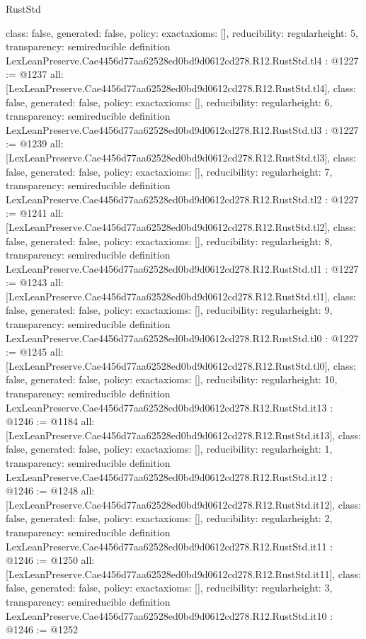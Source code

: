 \begin{lexlean}{RustStd}
\begin{coremodule}
{  class: false,
  generated: false,
  policy: exact{axioms: []},
  reducibility: regular{height: 5},
  transparency: semireducible
}
definition LexLeanPreserve.Cae4456d77aa62528ed0bd9d0612cd278.R12.RustStd.tl4 : @1227 := @1237 {
  all: [LexLeanPreserve.Cae4456d77aa62528ed0bd9d0612cd278.R12.RustStd.tl4],
  class: false,
  generated: false,
  policy: exact{axioms: []},
  reducibility: regular{height: 6},
  transparency: semireducible
}
definition LexLeanPreserve.Cae4456d77aa62528ed0bd9d0612cd278.R12.RustStd.tl3 : @1227 := @1239 {
  all: [LexLeanPreserve.Cae4456d77aa62528ed0bd9d0612cd278.R12.RustStd.tl3],
  class: false,
  generated: false,
  policy: exact{axioms: []},
  reducibility: regular{height: 7},
  transparency: semireducible
}
definition LexLeanPreserve.Cae4456d77aa62528ed0bd9d0612cd278.R12.RustStd.tl2 : @1227 := @1241 {
  all: [LexLeanPreserve.Cae4456d77aa62528ed0bd9d0612cd278.R12.RustStd.tl2],
  class: false,
  generated: false,
  policy: exact{axioms: []},
  reducibility: regular{height: 8},
  transparency: semireducible
}
definition LexLeanPreserve.Cae4456d77aa62528ed0bd9d0612cd278.R12.RustStd.tl1 : @1227 := @1243 {
  all: [LexLeanPreserve.Cae4456d77aa62528ed0bd9d0612cd278.R12.RustStd.tl1],
  class: false,
  generated: false,
  policy: exact{axioms: []},
  reducibility: regular{height: 9},
  transparency: semireducible
}
definition LexLeanPreserve.Cae4456d77aa62528ed0bd9d0612cd278.R12.RustStd.tl0 : @1227 := @1245 {
  all: [LexLeanPreserve.Cae4456d77aa62528ed0bd9d0612cd278.R12.RustStd.tl0],
  class: false,
  generated: false,
  policy: exact{axioms: []},
  reducibility: regular{height: 10},
  transparency: semireducible
}
definition LexLeanPreserve.Cae4456d77aa62528ed0bd9d0612cd278.R12.RustStd.it13 : @1246 := @1184 {
  all: [LexLeanPreserve.Cae4456d77aa62528ed0bd9d0612cd278.R12.RustStd.it13],
  class: false,
  generated: false,
  policy: exact{axioms: []},
  reducibility: regular{height: 1},
  transparency: semireducible
}
definition LexLeanPreserve.Cae4456d77aa62528ed0bd9d0612cd278.R12.RustStd.it12 : @1246 := @1248 {
  all: [LexLeanPreserve.Cae4456d77aa62528ed0bd9d0612cd278.R12.RustStd.it12],
  class: false,
  generated: false,
  policy: exact{axioms: []},
  reducibility: regular{height: 2},
  transparency: semireducible
}
definition LexLeanPreserve.Cae4456d77aa62528ed0bd9d0612cd278.R12.RustStd.it11 : @1246 := @1250 {
  all: [LexLeanPreserve.Cae4456d77aa62528ed0bd9d0612cd278.R12.RustStd.it11],
  class: false,
  generated: false,
  policy: exact{axioms: []},
  reducibility: regular{height: 3},
  transparency: semireducible
}
definition LexLeanPreserve.Cae4456d77aa62528ed0bd9d0612cd278.R12.RustStd.it10 : @1246 := @1252 {
}
\end{coremodule}
\end{lexlean}
